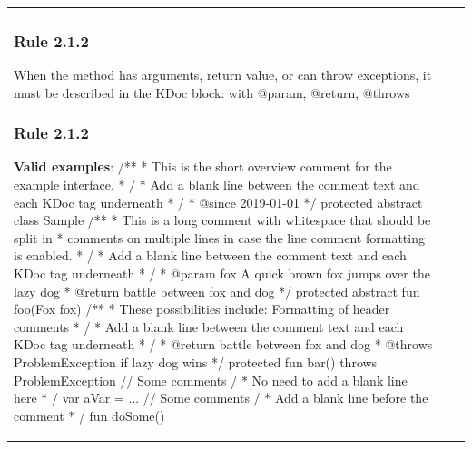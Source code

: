 \begin{center}
\begin{tabular}{ |p{}|p{}|p{}| }
\subsubsection*{\textbf{Rule 2.1.2}}
When the method has arguments, return value, or can throw exceptions, it must be described in the KDoc block: with @param, @return, @throws
\subsubsection*{\textbf{Rule 2.1.2}}
\textbf{Valid examples}:
/**
 * This is the short overview comment for the example interface.
 *     / * Add a blank line between the comment text and each KDoc tag underneath * /
 * @since 2019-01-01
 */
 protected abstract class Sample {
    /**
     * This is a long comment with whitespace that should be split in
     * comments on multiple lines in case the line comment formatting is enabled.
     *     / * Add a blank line between the comment text and each KDoc tag underneath * /
     * @param fox A quick brown fox jumps over the lazy dog
     * @return battle between fox and dog
     */
    protected abstract fun foo(Fox fox)
     /**
      * These possibilities include: Formatting of header comments
      *     / * Add a blank line between the comment text and each KDoc tag underneath * /
      * @return battle between fox and dog
      * @throws ProblemException if lazy dog wins
      */
    protected fun bar() throws ProblemException {
        // Some comments / * No need to add a blank line here * /
        var aVar = ...
        // Some comments  / * Add a blank line before the comment * /
        fun doSome()
    }
 }

\end{tabular}
\end{center}
